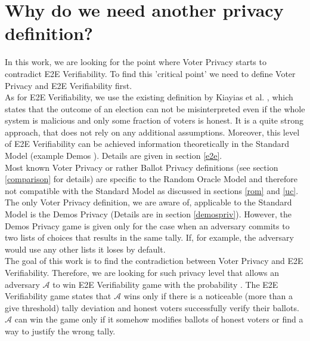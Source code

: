 \section{Why do we need another privacy definition?}
In this work, we are looking for the point where Voter Privacy starts to contradict E2E Verifiability. To find this 'critical point' we need to define Voter Privacy and E2E Verifiability first.\\ 

As for E2E Verifiability, we use the existing definition by Kiayias et al. \cite{Kiayias2015}, which states that the outcome of an election can not be misinterpreted even if the whole system is malicious and only some fraction of voters is honest. It is a quite strong approach, that does not rely on any additional assumptions. Moreover, this level of E2E Verifiability  can be achieved information theoretically in the Standard Model (example Demos  \cite{Kiayias2015}). Details are given in section \ref{e2e}.\\

Most known Voter Privacy or rather Ballot Privacy definitions (see section \ref{comparison} for details) are specific to the Random Oracle Model and therefore  not compatible with the Standard Model  as discussed in sections \ref{rom} and \ref{uc}.  The only Voter Privacy definition, we are aware of, applicable to the Standard Model is the Demos Privacy  \cite{Kiayias2015} (Details are in section \ref{demospriv}). However, the Demos Privacy game is given only for the case when an adversary commits to two lists of choices that results in the same tally. If, for example, the adversary would use any other lists it loses by default.  \\

The goal of this work is to find the contradiction between Voter Privacy and E2E Verifiability. Therefore, we are looking for such privacy level that allows an adversary $\mathcal{A}$ to win E2E Verifiability game with the probability . The E2E Verifiability game states that $\mathcal{A}$ wins only if there is a noticeable (more than a give threshold) tally deviation and honest voters successfully verify their ballots. $\mathcal{A}$ can win the game only if it somehow modifies ballots of honest voters or find a way to justify the wrong tally. \\


